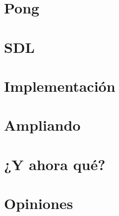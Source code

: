 \documentclass{beamer}
\begin{document}
\section{Pong}


\section{SDL}


\section{Implementación}


\section{Ampliando}


\section{¿Y ahora qué?}


\section{Opiniones}

\end{document}
